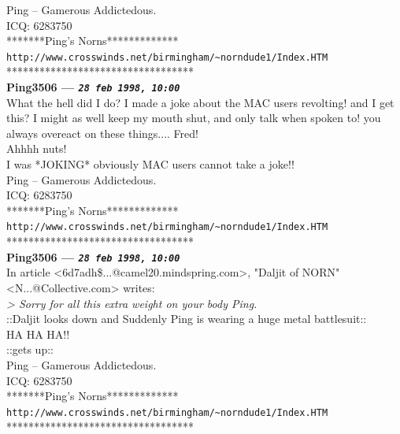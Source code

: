 \documentclass[11pt,twoside,a4paper]{article}
\begin{document}
\begin{multicols*}{2}
Ping -- Gamerous Addictedous.~\\
ICQ:  6283750~\\
*******Ping's Norns*************~\\
\texttt{http://www.crosswinds.net/birmingham/\textasciitilde norndude1/Index.HTM}~\\
**********************************~\\

 
		
	
		
\textbf{Ping3506 --- \emph{\texttt{28 feb 1998, 10:00}}}~\\

What the hell did I do? I made a joke about the MAC users revolting! and I get this? I might as well keep my mouth shut, and only talk when spoken to! you always overeact on these things.... Fred!~\\

Ahhhh nuts!~\\

I was *JOKING* obviously MAC users cannot take a joke!!~\\

Ping -- Gamerous Addictedous.~\\
ICQ:  6283750~\\
*******Ping's Norns*************~\\
\texttt{http://www.crosswinds.net/birmingham/\textasciitilde norndude1/Index.HTM}~\\
**********************************~\\


		
\textbf{Ping3506 --- \emph{\texttt{28 feb 1998, 10:00}}}~\\

In article <6d7adh\$...@camel20.mindspring.com>, "Daljit of NORN"~\\

<N...@Collective.com> writes:~\\
\emph{> Sorry for all this extra weight on your body Ping.}~\\

::Daljit looks down and Suddenly Ping is wearing a huge metal battlesuit::~\\

HA HA HA!!~\\

::gets up::~\\

Ping -- Gamerous Addictedous.~\\
ICQ:  6283750~\\
*******Ping's Norns*************~\\
\texttt{http://www.crosswinds.net/birmingham/\textasciitilde norndude1/Index.HTM}~\\
**********************************~\\




\end{multicols*}
\end{document}
